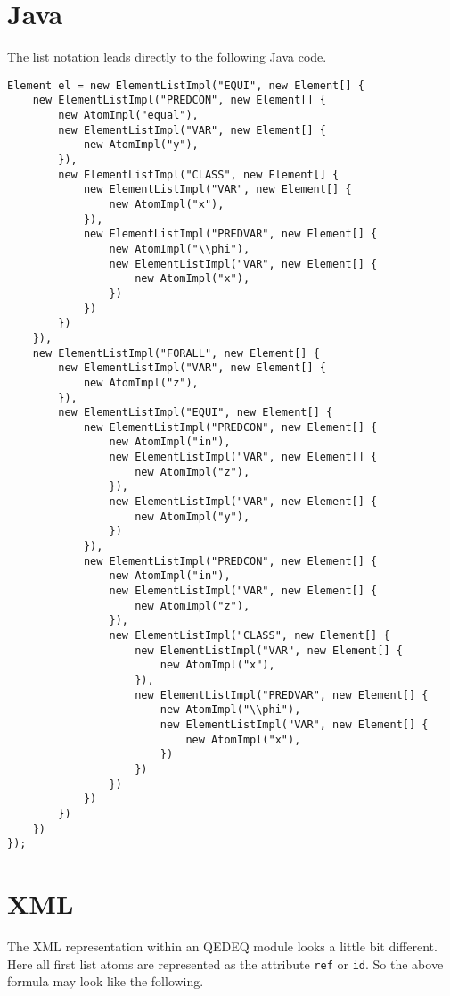 \documentclass[a4paper,german,10pt,twoside]{book}
\theoremstyle{definition}
\theoremstyle{remark}
\begin{document}
\section{Java} \label{chapter3_section1} \hypertarget{chapter3_section1}{}
The list notation leads directly to the following Java code.
\begin{verbatim}
Element el = new ElementListImpl("EQUI", new Element[] {
    new ElementListImpl("PREDCON", new Element[] {
        new AtomImpl("equal"), 
        new ElementListImpl("VAR", new Element[] {
            new AtomImpl("y"), 
        }),
        new ElementListImpl("CLASS", new Element[] {
            new ElementListImpl("VAR", new Element[] {
                new AtomImpl("x"), 
            }),
            new ElementListImpl("PREDVAR", new Element[] {
                new AtomImpl("\\phi"), 
                new ElementListImpl("VAR", new Element[] {
                    new AtomImpl("x"), 
                })
            })
        })
    }),
    new ElementListImpl("FORALL", new Element[] {
        new ElementListImpl("VAR", new Element[] {
            new AtomImpl("z"), 
        }),
        new ElementListImpl("EQUI", new Element[] {
            new ElementListImpl("PREDCON", new Element[] {
                new AtomImpl("in"), 
                new ElementListImpl("VAR", new Element[] {
                    new AtomImpl("z"), 
                }),
                new ElementListImpl("VAR", new Element[] {
                    new AtomImpl("y"), 
                })
            }),
            new ElementListImpl("PREDCON", new Element[] {
                new AtomImpl("in"), 
                new ElementListImpl("VAR", new Element[] {
                    new AtomImpl("z"), 
                }),
                new ElementListImpl("CLASS", new Element[] {
                    new ElementListImpl("VAR", new Element[] {
                        new AtomImpl("x"), 
                    }),
                    new ElementListImpl("PREDVAR", new Element[] {
                        new AtomImpl("\\phi"), 
                        new ElementListImpl("VAR", new Element[] {
                            new AtomImpl("x"), 
                        })
                    })
                })
            })
        })
    })
});

\end{verbatim}

\section{XML} \label{chapter3_section2} \hypertarget{chapter3_section2}{}
The XML representation within an QEDEQ module looks a little bit different. Here all first list atoms are represented as the attribute {\tt ref} or {\tt id}.
So the above formula may look like the following.
\end{document}
